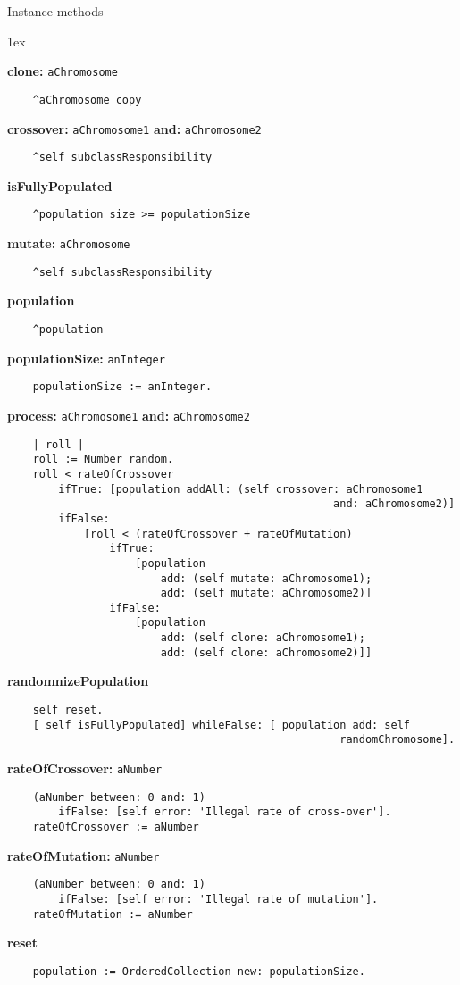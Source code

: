 Instance methods
{\parskip 1ex\par\noindent}
{\bf clone:} {\tt aChromosome}
\begin{verbatim}
    ^aChromosome copy

\end{verbatim}
{\bf crossover:} {\tt aChromosome1} {\bf and:} {\tt aChromosome2}
\begin{verbatim}
    ^self subclassResponsibility

\end{verbatim}
{\bf isFullyPopulated}
\begin{verbatim}
    ^population size >= populationSize 

\end{verbatim}
{\bf mutate:} {\tt aChromosome}
\begin{verbatim}
    ^self subclassResponsibility

\end{verbatim}
{\bf population}
\begin{verbatim}
    ^population

\end{verbatim}
{\bf populationSize:} {\tt anInteger}
\begin{verbatim}
    populationSize := anInteger.

\end{verbatim}
{\bf process:} {\tt aChromosome1} {\bf and:} {\tt aChromosome2}
\begin{verbatim}
    | roll |
    roll := Number random.
    roll < rateOfCrossover 
        ifTrue: [population addAll: (self crossover: aChromosome1 
                                                   and: aChromosome2)]
        ifFalse: 
            [roll < (rateOfCrossover + rateOfMutation) 
                ifTrue: 
                    [population
                        add: (self mutate: aChromosome1);
                        add: (self mutate: aChromosome2)]
                ifFalse: 
                    [population
                        add: (self clone: aChromosome1);
                        add: (self clone: aChromosome2)]]

\end{verbatim}
{\bf randomnizePopulation}
\begin{verbatim}
    self reset.
    [ self isFullyPopulated] whileFalse: [ population add: self 
                                                    randomChromosome].

\end{verbatim}
{\bf rateOfCrossover:} {\tt aNumber}
\begin{verbatim}
    (aNumber between: 0 and: 1) 
        ifFalse: [self error: 'Illegal rate of cross-over'].
    rateOfCrossover := aNumber

\end{verbatim}
{\bf rateOfMutation:} {\tt aNumber}
\begin{verbatim}
    (aNumber between: 0 and: 1) 
        ifFalse: [self error: 'Illegal rate of mutation'].
    rateOfMutation := aNumber

\end{verbatim}
{\bf reset}
\begin{verbatim}
    population := OrderedCollection new: populationSize.

\end{verbatim}

